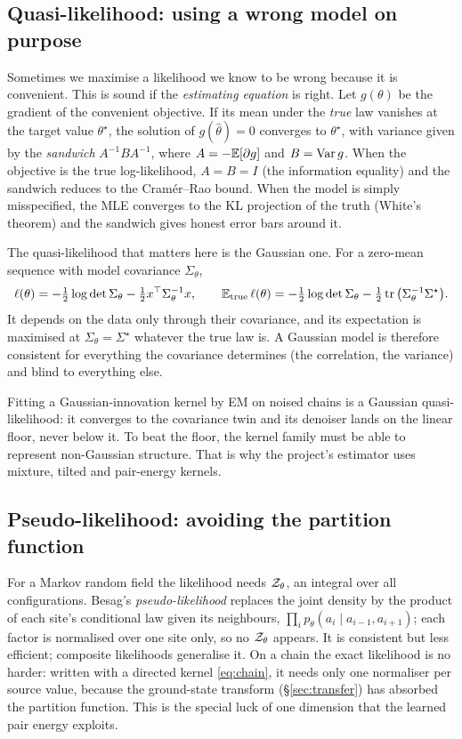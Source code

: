 \subsection{Quasi-likelihood: using a wrong model on purpose}

Sometimes we maximise a likelihood we know to be wrong because it is convenient. This is sound if the
\emph{estimating equation} is right. Let $g(\theta)$ be the gradient of the convenient objective. If its mean
under the \emph{true} law vanishes at the target value $\theta^\star$, the solution of $g(\hat\theta)=0$ converges to
$\theta^\star$, with variance given by the \emph{sandwich} $A^{-1}BA^{-1}$, where $A=-\mathbb{E}[\partial g]$ and $B=\operatorname{Var} g$. When the
objective is the true log-likelihood, $A=B=I$ (the information equality) and the sandwich reduces to the
Cram\'er--Rao bound. When the model is simply misspecified, the MLE converges to the KL projection of the
truth (White's theorem) and the sandwich gives honest error bars around it.

The quasi-likelihood that matters here is the Gaussian one. For a zero-mean sequence with model covariance
$\Sigma_\theta$,
\[
  \ell(\theta)=-\tfrac12\log\det\Sigma_\theta-\tfrac12x^{\top}\Sigma_\theta^{-1}x,\qquad
  \mathbb{E}_{\rm true}\,\ell(\theta)=-\tfrac12\log\det\Sigma_\theta-\tfrac12\operatorname{tr}\big(\Sigma_\theta^{-1}\Sigma^\star\big).
\]
It depends on the data only through their covariance, and its expectation is maximised at $\Sigma_\theta=\Sigma^\star$
whatever the true law is. A Gaussian model is therefore consistent for everything the covariance determines
(the correlation, the variance) and blind to everything else.

\begin{keyidea}
Fitting a Gaussian-innovation kernel by EM on noised chains is a Gaussian quasi-likelihood: it converges to
the covariance twin and its denoiser lands on the linear floor, never below it. To beat the floor, the kernel
family must be able to represent non-Gaussian structure. That is why the project's estimator uses mixture,
tilted and pair-energy kernels.
\end{keyidea}

\subsection{Pseudo-likelihood: avoiding the partition function}

For a Markov random field the likelihood needs $\mathcal{Z}_\theta$, an integral over all configurations. Besag's
\emph{pseudo-likelihood} replaces the joint density by the product of each site's conditional law given its
neighbours, $\prod_ip_\theta(a_i\mid a_{i-1},a_{i+1})$; each factor is normalised over one site only, so no $\mathcal{Z}_\theta$
appears. It is consistent but less efficient; composite likelihoods generalise it. On a chain the
exact likelihood is no harder: written with a directed kernel \eqref{eq:chain}, it needs only one normaliser per
source value, because the ground-state transform (\S\ref{sec:transfer}) has absorbed the partition function. This
is the special luck of one dimension that the learned pair energy exploits.

